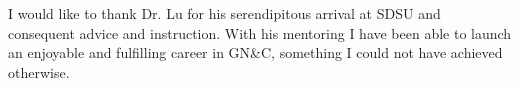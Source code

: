 \documentclass{sdsu-thesis}
\theoremstyle{dtm}
\begin{document}
\begin{glossarypage}
  \glsaddall\printglossary[title=]
\end{glossarypage}


\begin{acknowledgments}
I would like to thank Dr. Lu for his serendipitous arrival at SDSU and consequent 
advice and instruction. With his mentoring I have been able to launch an enjoyable 
and fulfilling career in GN\&C, something I could not have achieved otherwise. 

%
\end{acknowledgments}

%
%


% 
% 


% 
% 
% 




\end{document}

